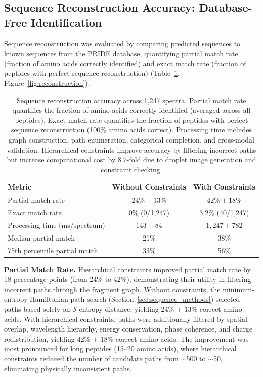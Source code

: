 \documentclass[11pt,twocolumn]{article}
\newcommand{\sentropy}{$\mathcal{S}$-entropy}
\begin{document}
\subsection{Sequence Reconstruction Accuracy: Database-Free Identification}

Sequence reconstruction was evaluated by comparing predicted sequences to known sequences from the PRIDE database, quantifying partial match rate (fraction of amino acids correctly identified) and exact match rate (fraction of peptides with perfect sequence reconstruction) (Table~\ref{tab:reconstruction}, Figure~\ref{fig:reconstruction}).

\begin{table}[h]
\centering
\caption{Sequence reconstruction accuracy across 1,247 spectra. Partial match rate quantifies the fraction of amino acids correctly identified (averaged across all peptides). Exact match rate quantifies the fraction of peptides with perfect sequence reconstruction (100\% amino acids correct). Processing time includes graph construction, path enumeration, categorical completion, and cross-modal validation. Hierarchical constraints improve accuracy by filtering incorrect paths but increase computational cost by 8.7-fold due to droplet image generation and constraint checking.}
\label{tab:reconstruction}
\begin{tabular}{@{}lcc@{}}
\toprule
Metric & Without Constraints & With Constraints \\
\midrule
Partial match rate & $24\% \pm 13\%$ & $42\% \pm 18\%$ \\
Exact match rate & $0\%$ (0/1,247) & $3.2\%$ (40/1,247) \\
Processing time (ms/spectrum) & $143 \pm 84$ & $1,247 \pm 782$ \\
Median partial match & 21\% & 38\% \\
75th percentile partial match & 33\% & 56\% \\
\bottomrule
\end{tabular}
\end{table}

\textbf{Partial Match Rate.} Hierarchical constraints improved partial match rate by 18 percentage points (from 24\% to 42\%), demonstrating their utility in filtering incorrect paths through the fragment graph. Without constraints, the minimum-entropy Hamiltonian path search (Section~\ref{sec:sequence_methods}) selected paths based solely on \sentropy{} distance, yielding 24\% $\pm$ 13\% correct amino acids. With hierarchical constraints, paths were additionally filtered by spatial overlap, wavelength hierarchy, energy conservation, phase coherence, and charge redistribution, yielding 42\% $\pm$ 18\% correct amino acids. The improvement was most pronounced for long peptides (15--20 amino acids), where hierarchical constraints reduced the number of candidate paths from $\sim$500 to $\sim$50, eliminating physically inconsistent paths.
\end{document}
